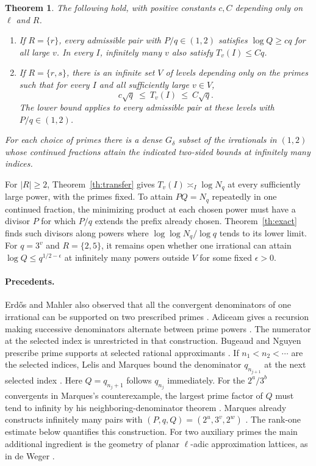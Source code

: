 \documentclass[11pt]{article}
\newtheorem{theorem}{Theorem}[section]
\begin{document}
\begin{theorem}\label{th:scales}
The following hold, with positive constants $c,C$ depending only on
$\ell$ and $R$.
\begin{enumerate}[label=(\roman*),nosep]
\item If $R=\{r\}$, every admissible pair with $P/q\in(1,2)$ satisfies
$\log Q\ge cq$ for all large $v$. In every $I$, infinitely many $v$
also satisfy $T_v(I)\le Cq$.
\item If $R=\{r,s\}$, there is an infinite set $V$ of levels depending
only on the primes such that for every $I$ and all sufficiently large
$v\in V$,
\[
                       c\sqrt q\ \le\ T_v(I)\ \le\ C\sqrt q .
\]
The lower bound applies to every admissible pair at these levels with
$P/q\in(1,2)$.
\end{enumerate}
For each choice of primes there is a dense $G_\delta$ subset of the
irrationals in $(1,2)$ whose continued fractions attain the indicated
two-sided bounds at infinitely many indices.
\end{theorem}

For $|R|\ge2$, Theorem~\ref{th:transfer} gives $T_v(I)\asymp_I\log N_q$
at every sufficiently large power, with the primes fixed. To attain
$P Q=N_q$ repeatedly in one continued fraction, the minimizing product at
each chosen power must have a divisor $P$ for which $P/q$ extends the
prefix already chosen. Theorem~\ref{th:exact} finds such divisors along
powers where $\log\log N_q/\log q$ tends to its lower limit.
For $q=3^v$ and $R=\{2,5\}$, it remains open whether one irrational
can attain $\log Q\le q^{1/2-\epsilon}$ at infinitely many powers outside
$V$ for some fixed $\epsilon>0$.

\paragraph{Precedents.}
Erd\H{o}s and Mahler also observed that all the convergent denominators
of one irrational can be supported on two prescribed primes
\cite[p.~18]{em}. Adiceam gives a
recursion making successive denominators alternate between prime powers
\cite[proof of Theorem 2, preprint version]{adiceam}. The numerator at the selected index
is unrestricted in that construction. Bugeaud and Nguyen prescribe prime
supports at selected rational approximants \cite[\S4]{bn}. If
$n_1<n_2<\cdots$ are the selected indices, Lelis and Marques bound the
denominator $q_{n_{j+1}}$ at the next selected index \cite[(2.1)]{lm}.
Here $Q=q_{n_j+1}$ follows $q_{n_j}$ immediately.
For the $2^a/3^b$ convergents in Marques's counterexample, the largest
prime factor of $Q$ must tend to infinity by his neighboring-denominator
theorem \cite[Theorem~1.1]{marques}. Marques already constructs infinitely many
pairs with $(P,q,Q)=(2^u,3^v,2^w)$ \cite[p.~2]{marques}.
The rank-one estimate below quantifies this construction. For two auxiliary
primes the main additional ingredient is the geometry of planar
$\ell$-adic approximation lattices, as in de Weger \cite{dw}.
\end{document}
